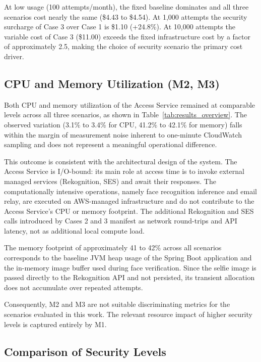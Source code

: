 At low usage (100 attempts/month), the fixed baseline dominates and all three scenarios cost nearly the same (\$4.43 to \$4.54). At 1{,}000 attempts the security surcharge of Case 3 over Case 1 is \$1.10 (+24.8\%). At 10{,}000 attempts the variable cost of Case 3 (\$11.00) exceeds the fixed infrastructure cost by a factor of approximately 2.5, making the choice of security scenario the primary cost driver.

\subsection{CPU and Memory Utilization (M2, M3)}

Both CPU and memory utilization of the Access Service remained at comparable levels across all three scenarios, as shown in Table~\ref{tab:results_overview}. The observed variation (3.1\% to 3.4\% for CPU, 41.2\% to 42.1\% for memory) falls within the margin of measurement noise inherent to one-minute CloudWatch sampling and does not represent a meaningful operational difference.

This outcome is consistent with the architectural design of the system. The Access Service is I/O-bound: its main role at access time is to invoke external managed services (Rekognition, SES) and await their responses. The computationally intensive operations, namely face recognition inference and email relay, are executed on AWS-managed infrastructure and do not contribute to the Access Service's CPU or memory footprint. The additional Rekognition and SES calls introduced by Cases 2 and 3 manifest as network round-trips and API latency, not as additional local compute load.

The memory footprint of approximately 41 to 42\% across all scenarios corresponds to the baseline JVM heap usage of the Spring Boot application and the in-memory image buffer used during face verification. Since the selfie image is passed directly to the Rekognition API and not persisted, its transient allocation does not accumulate over repeated attempts.

Consequently, M2 and M3 are not suitable discriminating metrics for the scenarios evaluated in this work. The relevant resource impact of higher security levels is captured entirely by M1.

\subsection{Comparison of Security Levels}

